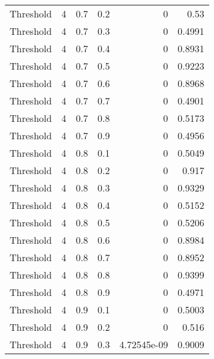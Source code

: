 \documentclass{article}
\begin{document}
\begin{longtable}[H]{lrrrrr}
 Threshold      &       4 &   0.7 &            0.2 &      0           &          0.53   \\
 Threshold      &       4 &   0.7 &            0.3 &      0           &          0.4991 \\
 Threshold      &       4 &   0.7 &            0.4 &      0           &          0.8931 \\
 Threshold      &       4 &   0.7 &            0.5 &      0           &          0.9223 \\
 Threshold      &       4 &   0.7 &            0.6 &      0           &          0.8968 \\
 Threshold      &       4 &   0.7 &            0.7 &      0           &          0.4901 \\
 Threshold      &       4 &   0.7 &            0.8 &      0           &          0.5173 \\
 Threshold      &       4 &   0.7 &            0.9 &      0           &          0.4956 \\
 Threshold      &       4 &   0.8 &            0.1 &      0           &          0.5049 \\
 Threshold      &       4 &   0.8 &            0.2 &      0           &          0.917  \\
 Threshold      &       4 &   0.8 &            0.3 &      0           &          0.9329 \\
 Threshold      &       4 &   0.8 &            0.4 &      0           &          0.5152 \\
 Threshold      &       4 &   0.8 &            0.5 &      0           &          0.5206 \\
 Threshold      &       4 &   0.8 &            0.6 &      0           &          0.8984 \\
 Threshold      &       4 &   0.8 &            0.7 &      0           &          0.8952 \\
 Threshold      &       4 &   0.8 &            0.8 &      0           &          0.9399 \\
 Threshold      &       4 &   0.8 &            0.9 &      0           &          0.4971 \\
 Threshold      &       4 &   0.9 &            0.1 &      0           &          0.5003 \\
 Threshold      &       4 &   0.9 &            0.2 &      0           &          0.516  \\
 Threshold      &       4 &   0.9 &            0.3 &      4.72545e-09 &          0.9009 \\

\end{longtable}
\end{document}
